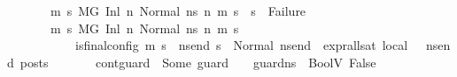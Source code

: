 \begin{isabellebody}
\ \ \ \ \ \ \ {\isachardoublequoteopen}{\isasymAnd}m{}\ s{}{\isachardot}{\kern0pt}\ {\isacharparenleft}{\kern0pt}M{\isacharcomma}{\kern0pt}{\isasymLambda}{\isacharcomma}{\kern0pt}{\isasymGamma}{\isacharcomma}{\kern0pt}{\isasymOmega}{\isacharcomma}{\kern0pt}G\ {\isasymturnstile}{\isacharparenleft}{\kern0pt}Inl\ n{\isacharcomma}{\kern0pt}\ Normal\ ns{}{\isacharprime}{\kern0pt}{\isacharprime}{\kern0pt}{\isacharparenright}{\kern0pt}\ {\isacharminus}{\kern0pt}n{\isasymrightarrow}{\isacharasterisk}{\kern0pt}\ {\isacharparenleft}{\kern0pt}m{}{\isacharcomma}{\kern0pt}\ s{}{\isacharparenright}{\kern0pt}{\isacharparenright}{\kern0pt}\ {\isasymLongrightarrow}\ s{}\ {\isasymnoteq}\ Failure{\isachardoublequoteclose}\isanewline
\ \ \ \ \ \ \ {\isachardoublequoteopen}{\isasymAnd}m{\isacharprime}{\kern0pt}\ s{\isacharprime}{\kern0pt}{\isachardot}{\kern0pt}\ {\isacharparenleft}{\kern0pt}M{\isacharcomma}{\kern0pt}{\isasymLambda}{\isacharcomma}{\kern0pt}{\isasymGamma}{\isacharcomma}{\kern0pt}{\isasymOmega}{\isacharcomma}{\kern0pt}G\ {\isasymturnstile}{\isacharparenleft}{\kern0pt}Inl\ n{\isacharcomma}{\kern0pt}\ Normal\ ns{}{\isacharprime}{\kern0pt}{\isacharprime}{\kern0pt}{\isacharparenright}{\kern0pt}\ {\isacharminus}{\kern0pt}n{\isasymrightarrow}{\isacharasterisk}{\kern0pt}\ {\isacharparenleft}{\kern0pt}m{\isacharprime}{\kern0pt}{\isacharcomma}{\kern0pt}\ s{\isacharprime}{\kern0pt}{\isacharparenright}{\kern0pt}{\isacharparenright}{\kern0pt}\ {\isasymLongrightarrow}\isanewline
\ \ \ \ \ \ \ \ \ \ \ is{\isacharunderscore}{\kern0pt}final{\isacharunderscore}{\kern0pt}config\ {\isacharparenleft}{\kern0pt}m{\isacharprime}{\kern0pt}{\isacharcomma}{\kern0pt}\ s{\isacharprime}{\kern0pt}{\isacharparenright}{\kern0pt}\ {\isasymLongrightarrow}\ {\isasymforall}ns{\isacharunderscore}{\kern0pt}end{\isachardot}{\kern0pt}\ s{\isacharprime}{\kern0pt}\ {\isacharequal}{\kern0pt}\ Normal\ ns{\isacharunderscore}{\kern0pt}end\ {\isasymlongrightarrow}\ {\isacharparenleft}{\kern0pt}expr{\isacharunderscore}{\kern0pt}all{\isacharunderscore}{\kern0pt}sat\ {\isasymLambda}{}{\isacharunderscore}{\kern0pt}local\ {\isasymGamma}\ {\isasymOmega}\ ns{\isacharunderscore}{\kern0pt}end{\isacharparenright}{\kern0pt}\ posts{\isachardoublequoteclose}\isanewline
\ \ \ \ \ \ \ {\isachardoublequoteopen}{\isacharparenleft}{\kern0pt}cont{\isacharunderscore}{\kern0pt}guard\ {\isacharequal}{\kern0pt}\ Some\ guard{\isacharparenright}{\kern0pt}\ {\isasymLongrightarrow}\ {\isacharparenleft}{\kern0pt}{\isasymLambda}{\isacharcomma}{\kern0pt}{\isasymGamma}{\isacharcomma}{\kern0pt}{\isasymOmega}\ {\isasymturnstile}\ {\isasymlangle}guard{\isacharcomma}{\kern0pt}ns{}{\isacharprime}{\kern0pt}{\isacharprime}{\kern0pt}{\isasymrangle}\ {\isasymDown}\ BoolV\ False{\isacharparenright}{\kern0pt}{\isachardoublequoteclose}\ \isanewline

\end{isabellebody}
